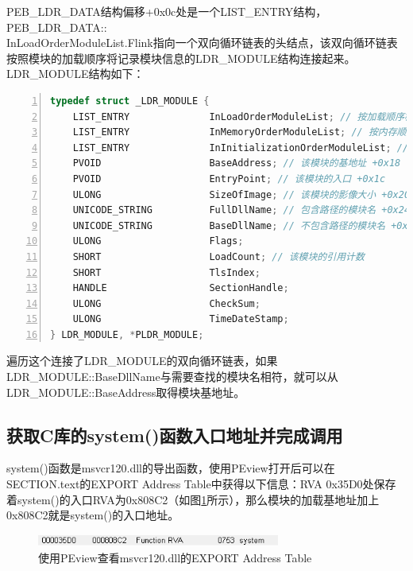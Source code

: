 \documentclass[bachelor]{thesis-uestc}
\begin{document}
PEB\_LDR\_DATA结构偏移+0x0c处是一个LIST\_ENTRY结构，PEB\_LDR\_DATA::\\InLoadOrderModuleList.Flink指向一个双向循环链表的头结点，该双向循环链表按照模块的加载顺序将记录模块信息的LDR\_MODULE结构连接起来。LDR\_MODULE结构如下：

\begin{lstlisting}[language=C++, basicstyle=\ttfamily\tiny, numbers=left, numberstyle=\tiny, keywordstyle=\color{blue!70}, commentstyle=\color{red!50!green!50!blue!50}, frame=shadowbox, rulesepcolor=\color{red!20!green!20!blue!20}]
typedef struct _LDR_MODULE {
	LIST_ENTRY              InLoadOrderModuleList; // 按加载顺序构成的模块链表 +0x00
	LIST_ENTRY              InMemoryOrderModuleList; // 按内存顺序构成的模块链表 +0x08
	LIST_ENTRY              InInitializationOrderModuleList; // 按初始化顺序构成的模块链表 +0x10
	PVOID                   BaseAddress; // 该模块的基地址 +0x18
	PVOID                   EntryPoint; // 该模块的入口 +0x1c
	ULONG                   SizeOfImage; // 该模块的影像大小 +0x20
	UNICODE_STRING          FullDllName; // 包含路径的模块名 +0x24
	UNICODE_STRING          BaseDllName; // 不包含路径的模块名 +0x28
	ULONG                   Flags;
	SHORT                   LoadCount; // 该模块的引用计数
	SHORT                   TlsIndex;
	HANDLE                  SectionHandle;
	ULONG                   CheckSum;
	ULONG                   TimeDateStamp;
} LDR_MODULE, *PLDR_MODULE;
\end{lstlisting}

遍历这个连接了LDR\_MODULE的双向循环链表，如果LDR\_MODULE::BaseDllName与需要查找的模块名相符，就可以从LDR\_MODULE::BaseAddress取得模块基地址。

\subsection{获取C库的system()函数入口地址并完成调用}
system()函数是msvcr120.dll的导出函数，使用PEview打开后可以在SECTION.text的EXPORT Address Table中获得以下信息：RVA 0x35D0处保存着system()的入口RVA为0x808C2（如图\ref{fig:libc_system_rva}所示），那么模块的加载基地址加上0x808C2就是system()的入口地址。

\begin{figure}[htbp]
	\centering\includegraphics[width=8cm]{images/libc_system_rva.png}
	\caption{使用PEview查看msvcr120.dll的EXPORT Address Table}
	\label{fig:libc_system_rva}
\end{figure}
\end{document}
